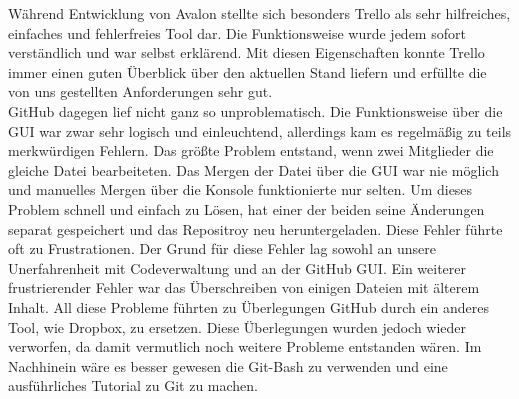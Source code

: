 Während Entwicklung von Avalon stellte sich besonders Trello als sehr hilfreiches, einfaches und fehlerfreies Tool dar. Die Funktionsweise wurde jedem sofort verständlich und war selbst erklärend. Mit diesen Eigenschaften konnte Trello immer einen guten Überblick über den aktuellen Stand liefern und erfüllte die von uns gestellten Anforderungen sehr gut.\\
GitHub dagegen lief nicht ganz so unproblematisch. Die Funktionsweise über die GUI war zwar sehr logisch und einleuchtend, allerdings kam es regelmäßig zu teils merkwürdigen Fehlern. Das größte Problem entstand, wenn zwei Mitglieder die gleiche Datei bearbeiteten. Das Mergen der Datei über die GUI war nie möglich und manuelles Mergen über die Konsole funktionierte nur selten. Um dieses Problem schnell und einfach zu Lösen, hat einer der beiden seine Änderungen separat gespeichert und das Repositroy neu heruntergeladen. Diese Fehler führte oft zu Frustrationen. Der Grund für diese Fehler lag sowohl an unsere Unerfahrenheit mit Codeverwaltung und an der GitHub GUI. Ein weiterer frustrierender Fehler war das Überschreiben von einigen Dateien mit älterem Inhalt. All diese Probleme führten zu Überlegungen GitHub durch ein anderes Tool, wie Dropbox, zu ersetzen. Diese Überlegungen wurden jedoch wieder verworfen, da damit vermutlich noch weitere Probleme entstanden wären. Im Nachhinein wäre es besser gewesen die Git-Bash zu verwenden und eine ausführliches Tutorial zu Git zu machen.





